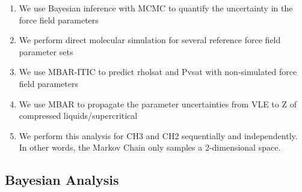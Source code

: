 \documentclass[preprint,letterpaper,floatfix,citeautoscript,aip,jcp]{revtex4-1}
\begin{document}
\begin{enumerate}
	\item We use Bayesian inference with MCMC to quantify the uncertainty in the force field parameters
	\item We perform direct molecular simulation for several reference force field parameter sets
	\item We use MBAR-ITIC to predict rholsat and Pvsat with non-simulated force field parameters
	\item We use MBAR to propagate the parameter uncertainties from VLE to Z of compressed liquids/supercritical
	\item We perform this analysis for CH3 and CH2 sequentially and independently. 
In other words, the Markov Chain only samples a 2-dimensional space. %
\end{enumerate}

\subsection{Bayesian Analysis}
\end{document}
